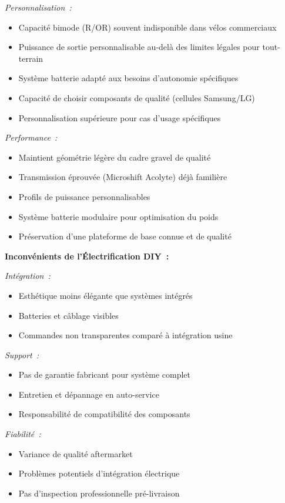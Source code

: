 \documentclass[12pt,a4paper]{article}
\begin{document}
\textit{Personnalisation~:}
\begin{itemize}
    \item Capacité bimode (R/OR) souvent indisponible dans vélos commerciaux
    \item Puissance de sortie personnalisable au-delà des limites légales pour tout-terrain
    \item Système batterie adapté aux besoins d'autonomie spécifiques
    \item Capacité de choisir composants de qualité (cellules Samsung/LG)
    \item Personnalisation supérieure pour cas d'usage spécifiques
\end{itemize}

\textit{Performance~:}
\begin{itemize}
    \item Maintient géométrie légère du cadre gravel de qualité
    \item Transmission éprouvée (Microshift Acolyte) déjà familière
    \item Profils de puissance personnalisables
    \item Système batterie modulaire pour optimisation du poids
    \item Préservation d'une plateforme de base connue et de qualité
\end{itemize}

\textbf{Inconvénients de l'Électrification DIY~:}

\textit{Intégration~:}
\begin{itemize}
    \item Esthétique moins élégante que systèmes intégrés
    \item Batteries et câblage visibles
    \item Commandes non transparentes comparé à intégration usine
\end{itemize}

\textit{Support~:}
\begin{itemize}
    \item Pas de garantie fabricant pour système complet
    \item Entretien et dépannage en auto-service
    \item Responsabilité de compatibilité des composants
\end{itemize}

\textit{Fiabilité~:}
\begin{itemize}
    \item Variance de qualité aftermarket
    \item Problèmes potentiels d'intégration électrique
    \item Pas d'inspection professionnelle pré-livraison
\end{itemize}
\end{document}
